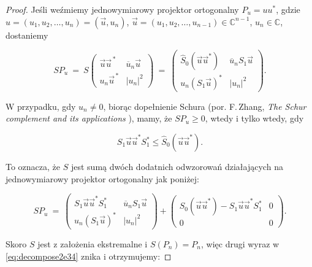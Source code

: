 \begin{proof}
Jeśli weźmiemy jednowymiarowy projektor ortogonalny
$P_{u} = u u^{*}$, gdzie
$u = (u_{1}, u_{2}, \ldots, u_{n}) = (\vec{u}, u_{n})$,
$\vec{u} = (u_{1}, u_{2}, \ldots, u_{n-1}) \in \mathbb{C}^{n-1}$,
$u_{n} \in \mathbb{C}$,
dostaniemy
\begin{linenomath*}
 \begin{equation}
 SP_{u} \:=\:  S \begin{pmatrix}
    \vec{u} \vec{u}^{\,*} & \overline{u}_{n} \vec{u} \\
    u_{n} \vec{u}^{\,*}   & |u_{n}|^{2}
 \end{pmatrix} \: = \:
 \begin{pmatrix}
    \hat{S}_{0}(\vec{u} \vec{u}^{*}) &
         \overline{u}_{n} S_{1} \vec{u} \\
    u_{n} ( S_{1} \vec{u} )^{*} &
        |u_{n}|^{2}
 \end{pmatrix}.
 \end{equation}
\end{linenomath*}
W przypadku, gdy $u_{n} \neq 0$,
biorąc dopełnienie Schura
(por. F.\,Zhang, \emph{The Schur complement and its applications} \cite{Zhang2006}),
mamy, że $SP_{u} \geq 0$, wtedy i tylko wtedy, gdy
\begin{linenomath*}
 \begin{equation}
\label{ieq:SchurForS}
  S_{1} \vec{u} \vec{u}^{*} S_{1}^{*} \leq \hat{S}_{0}(\vec{u}\vec{u}^{*}).
 \end{equation}
\end{linenomath*}
To oznacza, że $S$ jest sumą dwóch dodatnich odwzorowań działających na
jednowymiarowy projektor ortogonalny jak poniżej:
\begin{linenomath*}
 \begin{equation}
   \label{eq:decompose2e34}
 SP_{u} \:=\:
 \begin{pmatrix}
      S_{1} \vec{u} \vec{u}^{*} S_{1}^{*}  &
         \overline{u}_{n} S_{1} \vec{u} \\
    u_{n} ( S_{1} \vec{u} )^{*} &
        |u_{n}|^{2}
 \end{pmatrix} +
 \begin{pmatrix}
    \hat{S}_{0}(\vec{u} \vec{u}^{*})  -  S_{1} \vec{u} \vec{u}^{*} S_{1}^{*} & 0 \\
    0 & 0
 \end{pmatrix}.
 \end{equation}
\end{linenomath*}
Skoro $S$ jest z założenia ekstremalne i  $S(P_{n}) = P_{n}$,
więc drugi wyraz w \eqref{eq:decompose2e34} znika i otrzymujemy:

\end{proof}
